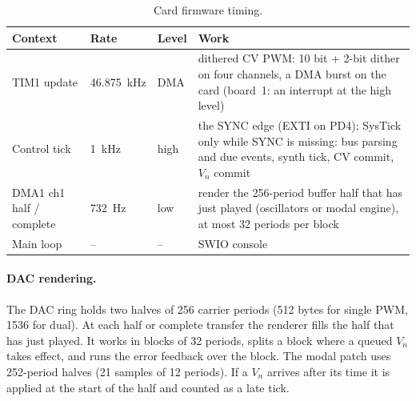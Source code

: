 \documentclass[11pt,a4paper]{article}
\begin{document}
\begin{table}[htbp]
\centering\small
\caption{Card firmware timing.}\label{tab:irq}
\begin{tabularx}{\textwidth}{@{}l l l X@{}}
\toprule
Context & Rate & Level & Work \\
\midrule
TIM1 update & \SI{46.875}{kHz} & DMA & dithered CV PWM: 10 bit + 2-bit dither on four channels, a DMA burst on the
  card (board~1: an interrupt at the high level) \\
Control tick & \SI{1}{kHz} & high & the SYNC edge (EXTI on PD4); SysTick only while SYNC is missing: bus parsing and due
  events, synth tick, CV commit, $V_n$ commit \\
DMA1 ch1 half / complete & \SI{732}{Hz} & low & render the 256-period buffer half that has just played (oscillators
  or modal engine), at most 32 periods per block \\
Main loop & -- & -- & SWIO console \\
\bottomrule
\end{tabularx}
\end{table}

\paragraph{DAC rendering.} The DAC ring holds two halves of 256 carrier periods (512 bytes for single PWM, 1536 for
dual). At each half or complete transfer the renderer fills the half that has just played. It works in blocks of 32
periods, splits a block where a queued $V_n$ takes effect, and runs the error feedback over the block. The modal patch
uses 252-period halves (21 samples of 12 periods). If a $V_n$ arrives after its time it is applied at the start of the
half and counted as a late tick.
\end{document}
